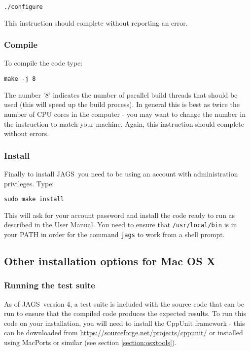 \documentclass[11pt, a4paper, titlepage]{article}
\newcommand{\JAGS}{\textsf{JAGS}}
\begin{document}
\begin{verbatim}
./configure
\end{verbatim}

This instruction should complete without reporting an error.

\subsubsection{Compile}
\label{section:osxcompile}

To compile the code type: 

\begin{verbatim} 
make -j 8 
\end{verbatim} 

The number '8' indicates the number of parallel build threads that
should be used (this will speed up the build process).  In general this
is best as twice the number of CPU cores in the computer - you may want
to change the number in the instruction to match your machine. Again,
this instruction should complete without errors.

\subsubsection{Install}
\label{section:osxinstall}

Finally to install \JAGS\ you need to be using an account with
administration privileges.  Type: 

\begin{verbatim}
sudo make install
\end{verbatim} 

This will ask for your account password and install the code ready to 
run as described in the User Manual. You need to ensure that
\texttt{/usr/local/bin} is in your PATH in order for the command 
\texttt{jags} to work from a shell prompt.

\subsection{Other installation options for Mac OS X}
\label{section:otherosxoptions}

\subsubsection{Running the test suite}

As of \JAGS\ version 4, a test suite is included with the source code that can be
run to ensure that the compiled code produces the expected results.  To run
this code on your installation, you will need to install the CppUnit framework - this can
be downloaded from \url{https://sourceforge.net/projects/cppunit/} or installed using
MacPorts or similar (see section \ref{section:osxtools}).
\end{document}
